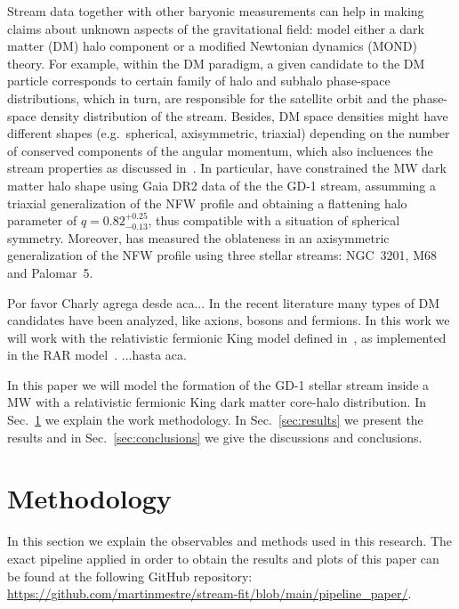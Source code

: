 \documentclass[twocolumn]{aa}
\begin{document}
Stream data together with other baryonic measurements can help in making claims about unknown aspects of the gravitational field: model either a dark matter (DM) halo component or a modified Newtonian dynamics (MOND) theory.
For example, within the DM paradigm, a given candidate to the DM particle corresponds to certain family of halo and subhalo phase-space distributions, which in turn, are responsible for the satellite orbit and the phase-space density distribution of the stream. Besides, DM space densities might have different shapes
(e.g.~spherical, axisymmetric, triaxial) depending on the number of conserved components of the angular momentum, which also incluences the stream properties as discussed in~\citet{2013ApJ...773L...4V,2016MNRAS.455.1079P,2020MNRAS.492.4398M}.
In particular, \citet{2019MNRAS.486.2995M} have constrained the MW dark matter halo shape using Gaia DR2 data of the the GD-1 stream, assumming a triaxial generalization of the NFW profile and obtaining a flattening halo parameter of $q=0.82^{+0.25}_{-0.13}$, thus compatible with a situation of spherical symmetry.
Moreover, \citep{2023MNRAS.524.2124P} has measured the oblateness in an axisymmetric generalization of the NFW profile using three stellar streams: NGC~3201, M68 and Palomar~5.

{\color{cyan}Por favor Charly agrega desde aca...}
In the recent literature many types of DM candidates have been analyzed, like axions, bosons and fermions.
In this work we will work with the relativistic fermionic King model defined in~\citet{2020EPJP..135..290C}, as implemented in the RAR model~\citep{arguelles_novel_2018}. {\color{cyan}...hasta aca.}

In this paper we will model the formation of the GD-1 stellar stream inside a MW with a relativistic fermionic King dark matter core-halo distribution. In Sec.~\ref{sec:methodology} we explain the work methodology. In Sec.~\ref{sec:results} we present the results  and in Sec.~\ref{sec:conclusions} we give the discussions and conclusions.

\section{Methodology}
\label{sec:methodology}
In this section we explain the observables and methods used in this research.
The exact pipeline applied in order to obtain the results and plots of this paper
can be found at the following GitHub repository:
\url{https://github.com/martinmestre/stream-fit/blob/main/pipeline_paper/}.
\end{document}
